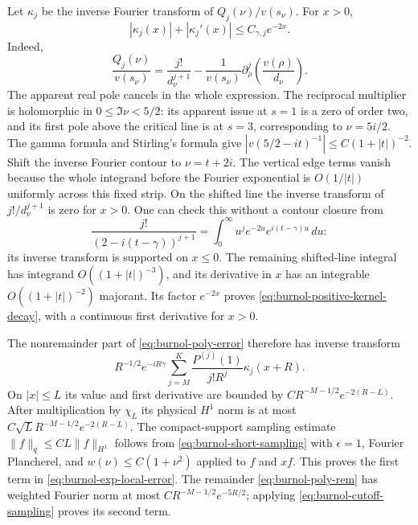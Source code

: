 Let $\kappa_j$ be the inverse Fourier transform of
$Q_j(\nu)/v(s_\nu)$. For $x>0$,
\begin{equation}\label{eq:burnol-positive-kernel-decay}
 |\kappa_j(x)|+|\kappa_j'(x)|
                   \le C_{\gamma,j}e^{-2x}.
\end{equation}
Indeed,
\[
 \frac{Q_j(\nu)}{v(s_\nu)}
 =\frac{j!}{d_\nu^{j+1}}
  -\frac1{v(s_\nu)}
        \partial_\rho^j\left(\frac{v(\rho)}{d_\nu}\right).
\]
The apparent real pole cancels in the whole expression.
The reciprocal multiplier is holomorphic in
$0\le\Im\nu<5/2$: its apparent issue at $s=1$ is a zero
of order two, and its first pole above the critical line
is at $s=3$, corresponding to $\nu=5i/2$.
The gamma formula and Stirling's formula give
$|v(5/2-it)^{-1}|\le C(1+|t|)^{-2}$.
Shift the inverse Fourier contour to $\nu=t+2i$.
The vertical edge terms vanish because the whole integrand
before the Fourier exponential is $O(1/|t|)$ uniformly
across this fixed strip. On the shifted line the inverse
transform of $j!/d_\nu^{j+1}$ is zero for $x>0$.
One can check this without a contour closure from
\[
 \frac{j!}{(2-i(t-\gamma))^{j+1}}
     =\int_0^\infty u^je^{-2u}e^{i(t-\gamma)u}\,du:
\]
its inverse transform is supported on $x\le0$.
The remaining shifted-line integral has integrand
$O((1+|t|)^{-3})$, and its derivative in $x$ has an
integrable $O((1+|t|)^{-2})$ majorant. Its factor $e^{-2x}$
proves \eqref{eq:burnol-positive-kernel-decay}, with a
continuous first derivative for $x>0$.

The nonremainder part of \eqref{eq:burnol-poly-error}
therefore has inverse transform
\[
 R^{-1/2}e^{-iR\gamma}
       \sum_{j=M}^K\frac{P^{(j)}(1)}{j!R^j}
                                     \kappa_j(x+R).
\]
On $|x|\le L$ its value and first derivative are bounded
by $CR^{-M-1/2}e^{-2(R-L)}$.
After multiplication by $\chi_L$ its physical $H^1$ norm
is at most $C\sqrt L R^{-M-1/2}e^{-2(R-L)}$.
The compact-support sampling estimate
$\|f\|_q\le CL\|f\|_{H^1}$ follows from
\eqref{eq:burnol-short-sampling} with $\epsilon=1$,
Fourier Plancherel, and
$w(\nu)\le C(1+\nu^2)$ applied to $f$ and $xf$.
This proves the first term in
\eqref{eq:burnol-exp-local-error}. The remainder
\eqref{eq:burnol-poly-rem} has weighted Fourier norm at
most $CR^{-M-1/2}e^{-5R/2}$; applying
\eqref{eq:burnol-cutoff-sampling} proves its second term.

